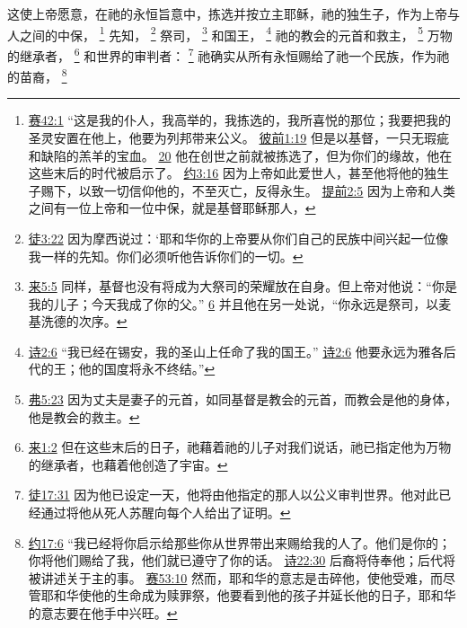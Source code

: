 \documentclass[12pt, a4paper, oneside]{ctexart}
\newcounter{parnum}[section]
\newcommand{\N}{%
   \noindent\refstepcounter{parnum}%
    \makebox[\parindent][l]{\textbf{\arabic{parnum}.}}}
\begin{document}
\N 这使上帝愿意，在祂的永恒旨意中，拣选并按立主耶稣，祂的独生子，作为上帝与人之间的中保，
	\footnote {
		\href{https://biblehub.com/isaiah/42-1.htm}{赛42:1} “这是我的仆人，我高举的，我拣选的，我所喜悦的那位；我要把我的圣灵安置在他上，他要为列邦带来公义。
		\href{https://biblehub.com/1_peter/1-19.htm}{彼前1:19} 但是以基督，一只无瑕疵和缺陷的羔羊的宝血。
		\href{https://biblehub.com/1_peter/1-20.htm}{20} 他在创世之前就被拣选了，但为你们的缘故，他在这些末后的时代被启示了。
		\href{https://biblehub.com/john/3-16.htm}{约3:16} 因为上帝如此爱世人，甚至他将他的独生子赐下，以致一切信仰他的，不至灭亡，反得永生。
		\href{https://biblehub.com/1_timothy/2-5.htm}{提前2:5} 因为上帝和人类之间有一位上帝和一位中保，就是基督耶稣那人，
	}
	先知，
	\footnote {
		\href{https://biblehub.com/acts/3-22.htm}{徒3:22} 因为摩西说过：‘耶和华你的上帝要从你们自己的民族中间兴起一位像我一样的先知。你们必须听他告诉你们的一切。
	}
	祭司，
	\footnote {
		\href{https://biblehub.com/hebrews/5-5.htm}{来5:5} 同样，基督也没有将成为大祭司的荣耀放在自身。但上帝对他说：“你是我的儿子；今天我成了你的父。”
		\href{https://biblehub.com/hebrews/5-6.htm}{6} 并且他在另一处说，“你永远是祭司，以麦基洗德的次序。
	}
	和国王，
	\footnote {
		\href{https://biblehub.com/psalms/2-6.htm}{诗2:6} “我已经在锡安，我的圣山上任命了我的国王。”
		\href{https://biblehub.com/luke/1-33.htm}{诗2:6} 他要永远为雅各后代的王；他的国度将永不终结。”
	}
	祂的教会的元首和救主，
	\footnote {
		\href{https://biblehub.com/ephesians/5-23.htm}{弗5:23} 因为丈夫是妻子的元首，如同基督是教会的元首，而教会是他的身体，他是教会的救主。
	}
	万物的继承者，
	\footnote {
		\href{https://biblehub.com/hebrews/1-2.htm}{来1:2} 但在这些末后的日子，祂藉着祂的儿子对我们说话，祂已指定他为万物的继承者，也藉着他创造了宇宙。
	}
	和世界的审判者：
	\footnote {
		\href{https://biblehub.com/acts/17-31.htm}{徒17:31} 因为他已设定一天，他将由他指定的那人以公义审判世界。他对此已经通过将他从死人苏醒向每个人给出了证明。
	}
	祂确实从所有永恒赐给了祂一个民族，作为祂的苗裔，
	\footnote {
		\href{https://biblehub.com/john/17-6.htm}{约17:6} “我已经将你启示给那些你从世界带出来赐给我的人了。他们是你的；你将他们赐给了我，他们就已遵守了你的话。
		\href{https://biblehub.com/psalms/22-30.htm}{诗22:30} 后裔将侍奉他；后代将被讲述关于主的事。
		\href{https://biblehub.com/isaiah/53-10.htm}{赛53:10} 然而，耶和华的意志是击碎他，使他受难，而尽管耶和华使他的生命成为赎罪祭，他要看到他的孩子并延长他的日子，耶和华的意志要在他手中兴旺。
	}
\end{document}
